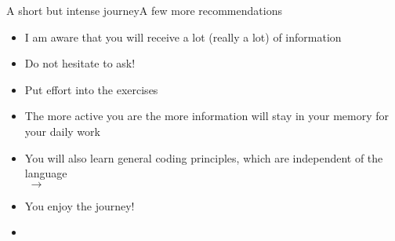 \begin{frame}{A short but intense journey}{A few more recommendations}
    \vspace{-3mm}
    \begin{itemize}
        \item I am aware that you will receive a lot (really a lot) of information
        \item Do not hesitate to ask!
        \item Put effort into the exercises
        \item The more active you are the more information will stay in your memory for your daily work
    \end{itemize}
    \vspace{5mm}
    {\large{}}
    \begin{itemize}[<2->]
        \item You will also learn general coding principles, which are independent of the language \\
              {\small$\;\to\;$ }
        \item You enjoy the journey! 
        \item {}
    \end{itemize}
    \vfill\hfill{}
\end{frame}

